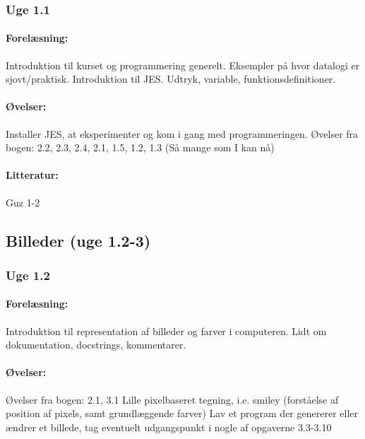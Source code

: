 \documentclass[12pt]{article}
\begin{document}
\subsubsection{Uge 1.1}

\paragraph{Forelæsning:} 
Introduktion til kurset og programmering generelt.
Eksempler på hvor datalogi er sjovt/praktisk.
Introduktion til JES. 
Udtryk, variable, funktionsdefinitioner.

\paragraph{Øvelser:}
Installer JES, at eksperimenter og kom i gang med programmeringen.
Øvelser fra bogen: 2.2, 2.3, 2.4, 2.1, 1.5, 1.2, 1.3 (Så mange som I kan nå)

\paragraph{Litteratur:} Guz 1-2


\subsection{Billeder (uge 1.2-3) }


\subsubsection{Uge 1.2}
\paragraph{Forelæsning:} 
Introduktion til representation af billeder og farver i computeren. Lidt om dokumentation, docstrings, kommentarer.

\paragraph{Øvelser:}
Øvelser fra bogen: 2.1, 3.1
Lille pixelbaseret tegning, i.e. smiley (forståelse af position af pixels, samt grundlæggende farver) 
Lav et program der genererer eller ændrer et billede, tag eventuelt udgangspunkt i nogle af opgaverne 3.3-3.10
\end{document}
